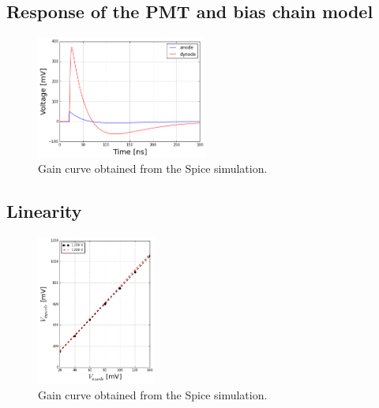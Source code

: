 \documentclass[letterpaper, 10 pt, conference]{ieeeconf}  %
\begin{document}
\subsection{Response of the PMT and bias chain model}

\begin{figure}[h!]
\begin{center}
\includegraphics[width=0.5\textwidth]{Figures/spice_pulse.png}
\caption{Gain curve obtained from the Spice simulation.}
\label{QE}
\end{center}
\end{figure}


\subsection{Linearity}




\begin{figure}[h!]
\begin{center}
\includegraphics[width=0.35\textwidth]{Figures/Linear.png}
\caption{Gain curve obtained from the Spice simulation.}
\label{QE}
\end{center}
\end{figure}
\end{document}
